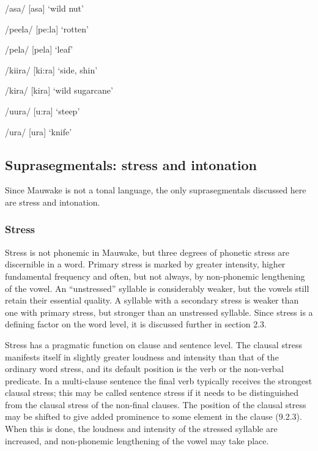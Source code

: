 /asa/  [a{{\textprimstress}sa}]  `wild  nut'

/peela/  [{{\textprimstress}pe:la}]  `rotten'

/pela/  [pe{{\textprimstress}la}]  `leaf'

/kiira/  [{{\textprimstress}ki:r}a]  `side, shin'

/kira/  [ki{{\textprimstress}ra}]  `wild sugarcane'

/{\textphi}uura/  [{{\textprimstress}}{\textphi}u:ra]  `steep'

/{\textphi}ura/  [{\textphi}u{{\textprimstress}ra}]  `knife'

\subsection{Suprasegmentals: stress and intonation}


Since Mauwake is not a tonal language, the only suprasegmentals discussed here are stress and intonation.

\subsubsection[Stress]{Stress}


Stress is not phonemic in Mauwake, but three degrees of phonetic stress are discernible in a word.  Primary stress is marked by greater intensity, higher fundamental frequency and often, but not always, by non-phonemic lengthening of the vowel.  An ``unstressed'' syllable is considerably weaker, but the vowels still retain their essential quality.  A syllable with a secondary stress is weaker than one with primary stress, but stronger than an unstressed syllable. Since stress is a defining factor on the word level, it is discussed further in section 2.3.

Stress has a pragmatic function on clause and sentence level. The clausal stress manifests itself in slightly greater loudness and intensity than that of the ordinary word stress, and its default position is the verb or the non-verbal predicate. In a multi-clause sentence the final verb typically receives the strongest clausal stress; this may be called sentence stress if it needs to be distinguished from the clausal stress of the non-final clauses. The position of the clausal stress may be shifted to give added prominence to some element in the clause (9.2.3). When this is done, the loudness and intensity of the stressed syllable are increased, and non-phonemic lengthening of the vowel may take place.

